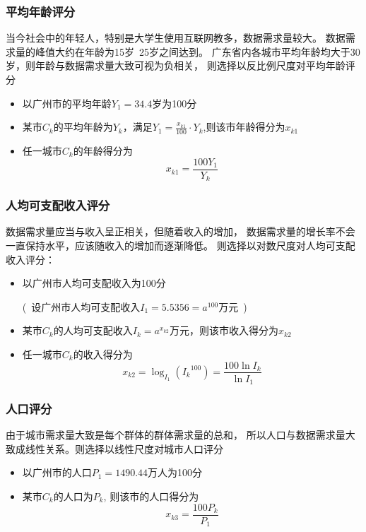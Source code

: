 \documentclass[UTF8,12pt]{ctexart}
\begin{document}
        \subsubsection{平均年龄评分}
            当今社会中的年轻人，特别是大学生使用互联网教多，数据需求量较大。
            数据需求量的峰值大约在年龄为15岁~25岁之间达到。
            广东省内各城市平均年龄均大于30岁，则年龄与数据需求量大致可视为负相关，
            则选择以反比例尺度对平均年龄评分
            \begin{itemize}
                \item 以广州市的平均年龄$Y_1=34.4$岁为100分
                \item 某市$C_k$的平均年龄为$Y_k$，满足$Y_1=\displaystyle\frac{x_{k1}}{100}·Y_k$,则该市年龄得分为$x_{k1}$
                \item 任一城市$C_k$的年龄得分为$$x_{k1}=\frac{100Y_1}{Y_k}$$
            \end{itemize}

        \subsubsection{人均可支配收入评分}
            数据需求量应当与收入呈正相关，但随着收入的增加，
            数据需求量的增长率不会一直保持水平，应该随收入的增加而逐渐降低。
            则选择以对数尺度对人均可支配收入评分：
            \begin{itemize}
                \item 以广州市人均可支配收入为100分\par 
                    (\ 设广州市人均可支配收入$I_1=5.5356=a^{100}$万元\ )
                \item 某市$C_k$的人均可支配收入$I_k=a^{x_{k2}}$万元，则该市收入得分为$x_{k2}$
                \item 任一城市$C_k$的收入得分为$$x_{k2}=\log _{I_1}({I_k}^{100})=\frac{100\ln I_k}{\ln I_1}$$
            \end{itemize}

        \subsubsection{人口评分}
            由于城市需求量大致是每个群体的群体需求量的总和，
            所以人口与数据需求量大致成线性关系。则选择以线性尺度对城市人口评分
            \begin{itemize}
                \item 以广州市的人口$P_1=1490.44$万人为100分
                \item 某市$C_k$的人口为$P_k$,
                    则该市的人口得分为$$x_{k3}=\frac{100P_k}{P_1}$$
            \end{itemize}
    
\end{document}
